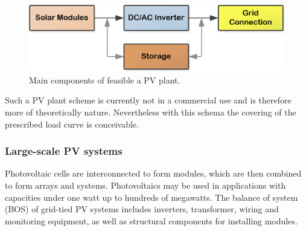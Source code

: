 \begin{figure}[!h] 
\centering
\includegraphics[width=0.75\linewidth]{FIG/PVMainComp}
\caption[Main components of feasible a PV plant.]{Main components of feasible a PV plant.}\label{PVMainComp}
\end{figure}
Such a PV plant scheme is currently not in a commercial use and is therefore more of theoretically nature. Nevertheless with this schema the covering of the prescribed load curve is conceivable.
\subsubsection{Large-scale PV systems}
Photovoltaic cells are interconnected to form modules, which are then combined to form arrays and systems. Photovoltaics may be used in applications with capacities under one watt up to hundreds of megawatts. The balance of system (BOS) of grid-tied PV systems includes inverters, transformer, wiring and monitoring equipment, as well as structural components for installing modules.  

